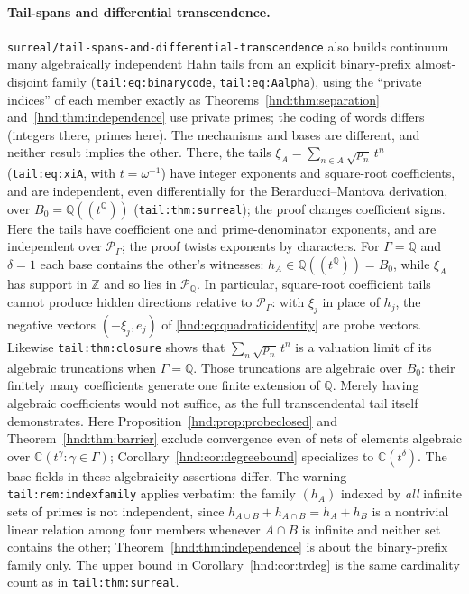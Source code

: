 \documentclass[11pt,oneside]{article}
\theoremstyle{definition}
\theoremstyle{remark}
\newcommand{\C}{\mathbb C}
\newcommand{\Q}{\mathbb Q}
\newcommand{\Z}{\mathbb Z}
\newcommand{\Pfield}{\mathscr P_\Gamma}
\newcommand{\repo}[1]{\nolinkurl{#1}}%
\newcommand{\lbl}[1]{\nolinkurl{#1}}%
\begin{document}
\paragraph{Tail-spans and differential transcendence.}
\repo{surreal/tail-spans-and-differential-transcendence} also builds
continuum many algebraically independent Hahn tails from an explicit
binary-prefix almost-disjoint family (\lbl{tail:eq:binarycode},
\lbl{tail:eq:Aalpha}), using the ``private indices'' of each member exactly
as Theorems~\ref{hnd:thm:separation} and~\ref{hnd:thm:independence} use
private primes; the coding of words differs (integers there, primes here).
The mechanisms and bases are different, and neither result implies the
other. There, the tails $\xi_A=\sum_{n\in A}\sqrt{p_n}\,t^n$
(\lbl{tail:eq:xiA}, with $t=\omega^{-1}$) have integer exponents and
square-root coefficients, and are independent, even differentially for the
Berarducci--Mantova derivation, over $B_0=\Q((t^\Q))$ (\lbl{tail:thm:surreal});
the proof changes coefficient signs. Here the tails have coefficient one
and prime-denominator exponents, and are independent over $\Pfield$; the
proof twists exponents by characters. For $\Gamma=\Q$ and $\delta=1$ each
base contains the other's witnesses: $h_A\in\Q((t^\Q))=B_0$, while
$\xi_A$ has support in $\Z$ and so lies in $\mathscr P_\Q$. In particular,
square-root coefficient tails cannot produce hidden directions relative to
$\Pfield$: with $\xi_j$ in place of $h_j$, the negative vectors
$(-\xi_j,e_j)$ of \eqref{hnd:eq:quadraticidentity} are probe vectors.
Likewise \lbl{tail:thm:closure} shows that $\sum_n\sqrt{p_n}\,t^n$ is a
valuation limit of its algebraic truncations when $\Gamma=\Q$.
Those truncations are algebraic over $B_0$: their finitely many
coefficients generate one finite extension of $\Q$. Merely having
algebraic coefficients would not suffice, as the full transcendental
tail itself demonstrates. Here Proposition~\ref{hnd:prop:probeclosed}
and Theorem~\ref{hnd:thm:barrier} exclude convergence even of nets of
elements algebraic over $\C(t^\gamma:\gamma\in\Gamma)$;
Corollary~\ref{hnd:cor:degreebound} specializes to $\C(t^\delta)$.
The base fields in these algebraicity assertions differ. The warning
\lbl{tail:rem:indexfamily} applies verbatim: the family $(h_A)$ indexed by
\emph{all} infinite sets of primes is not independent, since
$h_{A\cup B}+h_{A\cap B}=h_A+h_B$ is a nontrivial linear relation among
four members whenever $A\cap B$ is infinite and neither set contains the
other; Theorem~\ref{hnd:thm:independence} is
about the binary-prefix family only. The upper bound in
Corollary~\ref{hnd:cor:trdeg} is the same cardinality count as in
\lbl{tail:thm:surreal}.
\end{document}

